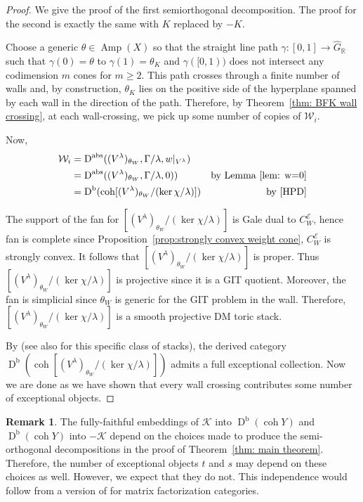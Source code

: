 \documentclass[reqno, 12pt]{amsart}
\theoremstyle{definition}
\newtheorem{remark}[theorem]{Remark}
\newcommand{\op}[1]{\operatorname{#1}}
\newcommand{\dbcoh}[1]{\operatorname{D}^{\operatorname{b}}(\operatorname{coh }#1)}
\newcommand{\dabs}{\op{D}^{\op{abs}}}
\def\ker{\op{\mbox{ker}}}
\newcommand{\Amp}{\operatorname{Amp}}
\numberwithin{equation}{section}
\begin{document}
\begin{proof}
We give the proof of the first semiorthogonal decomposition.  The proof for the second is exactly the same with $K$ replaced by $-K$.

Choose a generic $\theta \in \Amp(X)$ so that the straight line path $\gamma: [0,1] \to \widehat G_{\mathbb{R}}$ such that $\gamma(0) =\theta$ to $\gamma(1) =\theta_{K}$ and $\gamma([0,1))$ does not intersect any codimension $m$ cones for $m \geq 2$. 
This path crosses through a finite number of walls and, by construction, $\theta_K$ lies on the positive side of the hyperplane spanned by each wall in the direction of the path.  Therefore, by Theorem~\ref{thm: BFK wall crossing}, at each wall-crossing, we pick up some number of copies of $\mathcal W_i$.

Now, 
\begin{align*}
\mathcal W_i & = \dabs((V^\lambda)_{\theta_W}, \Gamma/\lambda, w|_{V^\lambda})  & \\
& = \dabs((V^\lambda)_{\theta_W}, \Gamma/\lambda, 0) )& \text{by Lemma~\ref{lem: w=0}} \\
&= \dbcoh{[(V^\lambda)_{\theta_W} / (\ker \chi /\lambda)]} &\text{by \cite[Proposition 2.1.6]{HPD}}
\end{align*}

The support of the fan for $[(V^\lambda)_{\theta_W} / (\ker \chi /\lambda)]$ is Gale dual to $C_W^{\mathcal E}$, hence fan is complete since Proposition~\ref{prop:strongly convex weight cone}, $C_W^{\mathcal E}$ is strongly convex. It follows that $[(V^\lambda)_{\theta_W} / (\ker \chi /\lambda)]$ is proper. Thus $[(V^\lambda)_{\theta_W} / (\ker \chi /\lambda)]$ is projective since it is a GIT quotient. Moreover, the fan is simplicial since $\theta_W$ is generic for the GIT problem in the wall. Therefore, $[(V^\lambda)_{\theta_W} / (\ker \chi /\lambda)]$ is a smooth projective DM toric stack.

By \cite[Theorem 1.1]{Kawamata} (see also \cite[5.2.3]{VGIT} for this specific class of stacks), the derived category $\dbcoh{[(V^\lambda)_{\theta_W} / (\ker \chi /\lambda)]}$ admits a full exceptional collection. Now we are done as we have shown that every wall crossing contributes some number of exceptional objects.
\end{proof}

\begin{remark}
    The fully-faithful embeddings of $\mathcal K$ into $\dbcoh{Y}$ and $\dbcoh{Y}$ into $-\mathcal K$ depend on the choices made to produce the semi-orthogonal decompositions in the proof of Theorem~\ref{thm: main theorem}.  Therefore, the number of exceptional objects $t$ and $s$ may depend on these choices as well.  However, we expect that they do not.  This independence would follow from a version of \cite[Theorem A]{KS22} for matrix factorization categories.
\end{remark}
\end{document}
